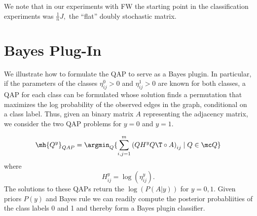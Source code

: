 We note that in our experiments with FW the starting point in the classification
experiments was $\frac{1}{n} J,$ the ``flat'' doubly stochastic matrix.
%
%
%
%
%

\section{Bayes Plug-In}
We illustrate how to formulate the QAP to serve as a Bayes plugin.  In particular,
if the parameters of the classes $\eta_{ij}^0 >0$ and $\eta _{ij}^1> 0$ are known for both
classes, a QAP for each class can be formulated whose solution finds a permutation 
that maximizes the log probability of the observed edges in the graph, conditional on a class label.
Thus, given an   
binary matrix $A$ representing the adjacency matrix, we consider the two QAP problems for $y=0$ and $y=1.$

$$
\mh {Q^y}_{QAP}=\argmin_{Q}\lbrace { \sum_{i,j=1}^m \left(Q H^y Q\T \circ A \right)_{ij}
\mid Q \in {\mc Q} }\rbrace
$$
where
$$H^y_{ij}=\log (\eta_{ij}^y).$$
The solutions to these QAPs return the $\log(P(A|y))$ for $y=0,1.$  Given priors $P(y)$ and Bayes rule 
we can readily compute the posterior probabliities of the class labels 0 and 1 and thereby form a Bayes plugin classifier.
